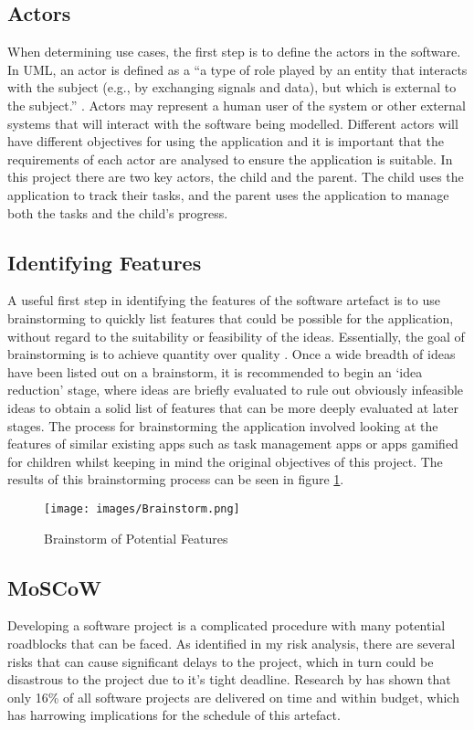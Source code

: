 \subsection{Actors}
When determining use cases, the first step is to define the actors in the software.
In UML, an actor is defined as a ``a type of role played by an entity that interacts with the subject (e.g., by exchanging signals and data), but which is external to the subject.'' \citep[p586-588]{omg2007unified}.
Actors may represent a human user of the system or other external systems that will interact with the software being modelled.
Different actors will have different objectives for using the application and it is important that the requirements of each actor are analysed to ensure the application is suitable.
In this project there are two key actors, the child and the parent. The child uses the application to track their tasks, and the parent uses the application to manage both the tasks and the child's progress.

\subsection{Identifying Features}
A useful first step in identifying the features of the software artefact is to use brainstorming to quickly list features that could be possible for the application, without regard to the suitability or feasibility of the ideas.
Essentially, the goal of brainstorming is to achieve quantity over quality \citep[p.144]{leffingwell2000managing}.
Once a wide breadth of ideas have been listed out on a brainstorm, it is recommended to begin an `idea reduction' stage, where ideas are briefly evaluated to rule out obviously infeasible ideas to obtain a solid list of features that can be more deeply evaluated at later stages.
The process for brainstorming the application involved looking at the features of similar existing apps such as task management apps or apps gamified for children whilst keeping in mind the original objectives of this project.
The results of this brainstorming process can be seen in figure \ref{fig:brainstorm}.

\begin{figure}[ht]
	\centering
	\texttt{[image: images/Brainstorm.png]}
	\caption{Brainstorm of Potential Features}
	\label{fig:brainstorm}
\end{figure} 

\subsection{MoSCoW}
Developing a software project is a complicated procedure with many potential roadblocks that can be faced.
As identified in my risk analysis, there are several risks that can cause significant delays to the project, which in turn could be disastrous to the project due to it's tight deadline.
Research by \cite{requirementsprioritization} has shown that only 16\% of all software projects are delivered on time and within budget, which has harrowing implications for the schedule of this artefact.

